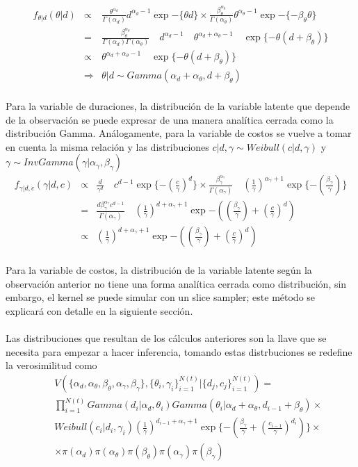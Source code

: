 \begin{eqnarray*}
f_{\theta|d}(\theta|d) &\propto& \frac{\theta^{\alpha_d}}{\Gamma(\alpha_d)} d^{\alpha_d-1} \exp{-\{\theta d\}} \times \frac{\beta_\theta^{\alpha_\theta}}{\Gamma(\alpha_\theta)} \theta^{\alpha_\theta-1} \exp{-\{-\beta_\theta \theta\}}\\
&=&\frac{\beta_\theta^{\alpha_\theta}}{\Gamma(\alpha_d)\Gamma(\alpha_\theta)} \quad d^{\alpha_d-1} \quad\theta^{\alpha_d+\alpha_\theta-1} \quad \exp{\{-\theta(d+\beta_\theta)\}}\\
&\propto& \theta^{\alpha_d+\alpha_\theta-1} \quad \exp{\{-\theta(d+\beta_\theta)\}}\\
&\Rightarrow& \theta|d \sim Gamma(\alpha_d+\alpha_\theta,d+\beta_\theta)
\end{eqnarray*}
\\
Para la variable de duraciones, la distribuci\'on de la variable latente que depende de la observaci\'on se puede expresar de una manera anal\'itica cerrada como la distribuci\'on Gamma. An\'alogamente, para la variable de costos se vuelve a tomar en cuenta la misma relaci\'on y las distribuciones $c|d,\gamma \sim Weibull(c|d,\gamma)$ y $\gamma \sim InvGamma(\gamma|\alpha_\gamma,\beta_\gamma)$
\begin{eqnarray*}
f_{\gamma|d,c}(\gamma|d,c) &\propto& \frac{d}{\gamma^d}\quad c^{d-1} \exp{\{-(\frac{c}{\gamma})^d\}} \times \frac{\beta_\gamma^{\alpha_\gamma}}{\Gamma(\alpha_\gamma)}\quad (\frac{1}{\gamma})^{\alpha_\gamma+1} \exp{\{-(\frac{\beta_\gamma}{\gamma})\}}\\
&=&\frac{d\beta_\gamma^{\alpha_\gamma} c^{d-1}}{\Gamma(\alpha_\gamma)}\quad (\frac{1}{\gamma})^{d+\alpha_\gamma+1}\exp{-((\frac{\beta_\gamma}{\gamma})+(\frac{c}{\gamma})^d)}\\
&\propto&(\frac{1}{\gamma})^{d+\alpha_\gamma+1}\exp{-((\frac{\beta_\gamma}{\gamma})+(\frac{c}{\gamma})^d)}
\end{eqnarray*}
\\
Para la variable de costos, la distribuci\'on de la variable latente seg\'un la observaci\'on anterior no tiene una forma anal\'itica cerrada como distribuci\'on, sin embargo, el kernel se puede simular con un slice sampler; este m\'etodo se explicar\'a con detalle en la siguiente secci\'on. \\
\\
Las distribuciones que resultan de los c\'alculos anteriores son la llave que se necesita para empezar a hacer inferencia, tomando estas distrbuciones se redefine la verosimilitud como
\begin{eqnarray*}
&&V(\{\alpha_d,\alpha_\theta,\beta_\theta,\alpha_\gamma,\beta_\gamma\},\{\theta_i,\gamma_i\}_{i=1}^{N(t)}|\{d_j,c_j\}_{i=1}^{N(t)})=\\ 
&&\prod_{i=1}^{N(t)} Gamma(d_i|\alpha_d,\theta_i) Gamma(\theta_i|\alpha_d+\alpha_\theta,d_{i-1}+\beta_\theta)\times \\
&&Weibull(c_i|d_i,\gamma_i)(\frac{1}{\gamma})^{d_{i-1}+\alpha_\gamma+1}\exp\{-(\frac{\beta_\gamma}{\gamma}+(\frac{c_{i-1}}{\gamma})^{d_i})\} \times \\
&&\times \pi(\alpha_d)\pi(\alpha_\theta)\pi(\beta_\theta)\pi(\alpha_\gamma)\pi(\beta_\gamma)
\end{eqnarray*}
